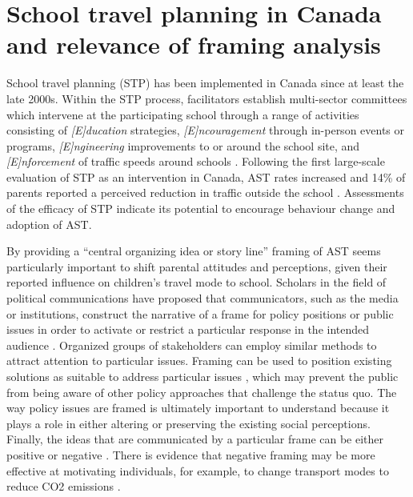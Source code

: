 \documentclass[preprint, 3p,
authoryear]{elsarticle} %
\begin{document}
\hypertarget{school-travel-planning-in-canada-and-relevance-of-framing-analysis}{%
\section{School travel planning in Canada and relevance of framing
analysis}\label{school-travel-planning-in-canada-and-relevance-of-framing-analysis}}

School travel planning (STP) has been implemented in Canada since at
least the late 2000s. Within the STP process, facilitators establish
multi-sector committees which intervene at the participating school
through a range of activities consisting of \emph{{[}E{]}ducation}
strategies, \emph{{[}E{]}ncouragement} through in-person events or
programs, \emph{{[}E{]}ngineering} improvements to or around the school
site, and \emph{{[}E{]}nforcement} of traffic speeds around schools
\citep[or
4Es,][]{langUnderstandingModalChoice2011, mammenActiveSchoolTravel2014}.
Following the first large-scale evaluation of STP as an intervention in
Canada, AST rates increased and 14\% of parents reported a perceived
reduction in traffic outside the school
\citep{buliungSchoolTravelPlanning2011}. Assessments of the efficacy of
STP
\citep{buttazzoniPromotingActiveSchool2019, mammenActiveSchoolTravel2014}
indicate its potential to encourage behaviour change and adoption of
AST.

By providing a ``central organizing idea or story line''
\citep{gamsonChangingCulture1987} framing of AST seems particularly
important to shift parental attitudes and perceptions, given their
reported influence on children's travel mode to school. Scholars in the
field of political communications have proposed that communicators, such
as the media or institutions, construct the narrative of a frame for
policy positions or public issues in order to activate or restrict a
particular response in the intended audience
\citep{panFramingAnalysisApproach1993}. Organized groups of stakeholders
can employ similar methods to attract attention to particular issues.
Framing can be used to position existing solutions as suitable to
address particular issues \citep{mahFramecriticalPolicyAnalysis2014},
which may prevent the public from being aware of other policy approaches
that challenge the status quo. The way policy issues are framed is
ultimately important to understand because it plays a role in either
altering or preserving the existing social perceptions. Finally, the
ideas that are communicated by a particular frame can be either positive
or negative \citep{waygoodCO2ValenceFraming2018}. There is evidence that
negative framing may be more effective at motivating individuals, for
example, to change transport modes to reduce CO2 emissions
\citep{waygoodCO2ValenceFraming2018}.
\end{document}
